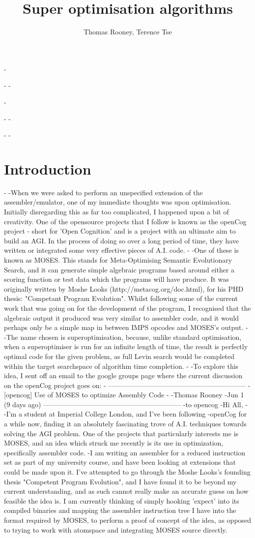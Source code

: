 -\documentclass[11pt]{article}
\begin{document}
-
-\title{Super optimisation algorithms}
-\author{Thomas Rooney, Terence Tse}
-
-\maketitle
-
-\section{Introduction}
-
-When we were asked to perform an unspecified extension of the assembler/emulator, one of my immediate thoughts was upon optimisation. Initially disregarding this as far too complicated, I happened upon a bit of creativity. One of the opensource projects that I follow is known as the openCog project - short for 'Open Cognition' and is a project with an ultimate aim to build an AGI. In the process of doing so over a long period of time, they have written or integrated some very effective pieces of A.I. code. 
-
-One of these is known as MOSES. This stands for Meta-Optimising Semantic Evolutionary Search, and it can generate simple algebraic programs based around either a scoring function or test data which the programs will have produce. It was originally written by Moshe Looks (http://metacog.org/doc.html), for his PHD thesis: "Competant Program Evolution". Whilst following some of the current work that was going on for the development of the program, I recognised that the algebraic output it produced was very similar to assembler code, and it would perhaps only be a simple map in between IMPS opcodes and MOSES's output. 
-
-The name chosen is superoptimisation, because, unlike standard optimisation, when a superoptimiser is run for an infinite length of time, the result is perfectly optimal code for the given problem, as full Levin search would be completed within the target searchspace of algorithm time completion.
-
-To explore this idea, I sent off an email to the google groups page where the current discussion on the openCog project goes on:
-
------------------------------------------------------------
-[opencog] Use of MOSES to optimize Assembly Code
-
-Thomas Rooney
-Jun 1 (9 days ago)
------------------------------------------------------------
-to opencog 
-Hi All,
-
-I'm a student at Imperial College London, and I've been following
-openCog for a while now, finding it an absolutely fascinating trove of A.I. techniques towards solving the AGI problem. One of the projects that particularly interests me is MOSES, and an idea which struck me recently is its use in optimization, specifically assembler code. 
-I am writing an assembler for a reduced instruction set as part of my university course, and have been looking at extensions that could be made upon it. I've attempted to go through the Moshe Looks's founding thesis "Competent Program Evolution", and I have found it to be beyond my current understanding, and as such cannot really make an accurate guess on how feasible the idea is. I am currently thinking of simply hooking 'expect' into its compiled binaries and mapping the assembler instruction tree I have into the format required by MOSES, to perform a proof of concept of the idea, as opposed to trying to work with atomspace and integrating MOSES source directly.
\end{document}
